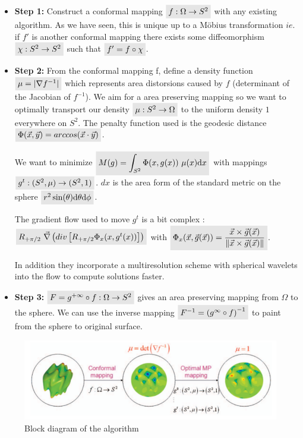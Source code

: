 \documentclass[11pt,a4paper]{article}
\renewcommand{\colbox}[1]{\colorbox{lightgray}{$ #1 $}}
\renewcommand{\norm}[1]{\lVert #1 \rVert}
\renewcommand{\det}[1]{\lvert #1 \rvert}
\begin{document}
\begin{itemize}

    \item \textbf{Step 1:} Construct a conformal mapping $\colbox{f : \Omega \to S^2}$ with any existing algorithm. As we have seen, this is unique up to a Möbius transformation $ie. $ if $f'$ is another conformal mapping there exists some diffeomorphism $\colbox{\chi : S^2 \to S^2}$ such that $\colbox{f' = f \circ \chi}$.
    
    \item \textbf{Step 2:} From the conformal mapping f, define a density function $\colbox{\mu = \det{\nabla f^{-1}}}$ which represents area distorsions caused by $f$ (determinant of the Jacobian of $f^{-1}$). 
        We aim for a area preserving mapping so we want to optimally transport our density $\colbox{\mu : S^2 \to \Omega}$ to the uniform density $1$ everywhere on $S^2$. The penalty function used is the geodesic distance $\colbox{\Phi(\vec{x},\vec{y}) = arccos(\vec{x} \cdot \vec{y})}$. 

        \vskip 0.3cm
        We want to minimize $\colbox{M(g) = \displaystyle \int_{S^2} \Phi(x, g(x))\ \mu(x) \mathrm{d}x}$ with mappings $\colbox{g^t: (S^2,\mu) \to (S^2, 1)}$.
        $dx$ is the area form of the standard metric on the sphere $\colbox{r^2 \sin(\theta) \mathrm{d}\theta \mathrm{d}\phi}$.
        
        The gradient flow used to move $g^t$ is a bit complex : $\colbox{R_{+\pi/2}\ \vec{\nabla} \left( div \left[ R_{+\pi/2}\Phi_x(x, g^t(x)) \right] \right)}$
        with $\colbox{\Phi_x(\vec{x}, \vec{g}(\vec{x})) = \dfrac{ \vec{x} \times \vec{g}(\vec{x}) }{\norm{\vec{x} \times \vec{g}(\vec{x})}  }}$.

        In addition they incorporate a multiresolution scheme with spherical wavelets into the flow to compute solutions faster.
    
    \item \textbf{Step 3:} $\colbox{F = g^{+\infty} \circ f : \Omega \to S^2}$ gives an area preserving mapping from $\Omega$ to the sphere. We can use the inverse mapping $\colbox{F^{-1} = \left( g^{\infty} \circ f \right)^{-1}}$ to paint from the sphere to original surface. 
\end{itemize}

\begin{figure}[H]
   \centering
   \includegraphics[width=16cm]{6.png}
   \caption{Block diagram of the algorithm}
\end{figure}
\vskip 0.3cm
\end{document}
